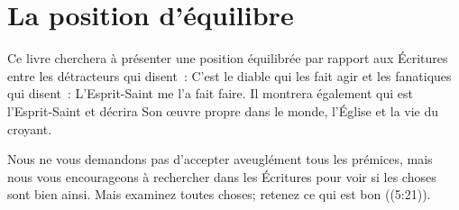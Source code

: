 \section{La position d'\'equilibre}

Ce livre cherchera à présenter une position équilibrée par rapport aux Écritures
 entre les détracteurs qui disent~: \Og C'est le diable qui les fait agir \Fg{}
 et les fanatiques qui disent~: \Og L'Esprit-Saint me l'a fait faire. \Fg{}
 Il montrera également qui est l'Esprit-Saint et décrira Son œuvre propre dans
 le monde, l'Église et la vie du croyant.

Nous ne vous demandons pas d'accepter aveuglément tous les prémices, mais nous
 vous encourageons à rechercher dans les Écritures pour voir si les choses sont
 bien ainsi. \Og Mais examinez toutes choses; retenez ce qui est bon \Fg{}
 ((5:21)).
\thispagestyle{chapterend}

